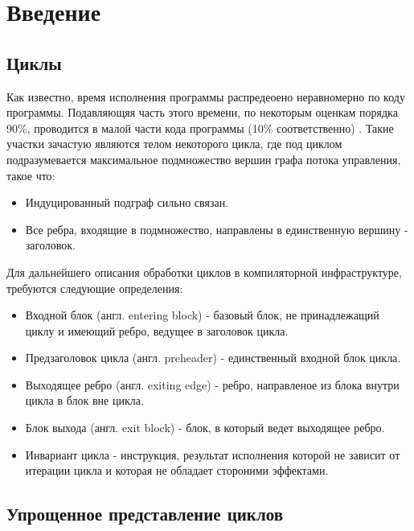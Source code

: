 \chapter{Введение}
\label{sec:Chapter0} 

\section{Циклы}

Как известно, время исполнения программы распредеоено неравномерно по коду программы.
Подавляющяя часть этого времени, по некоторым оценкам порядка 90\%, проводится в малой части кода программы (10\% соответственно) \cite{Aho_Ullman_focs}.
Такие участки зачастую являются телом некоторого цикла, где под циклом подразумевается максимальное подмножество вершин графа потока управления, такое что:
\begin{itemize}
    \item Индуцированный подграф сильно связан.
    \item Все ребра, входящие в подмножество, направлены в единственную вершину - заголовок.
\end{itemize}

Для дальнейшего описания обработки циклов в компиляторной инфраструктуре, требуются следующие определения:
\begin{itemize}
    \item Входной блок (англ. entering block) - базовый блок, не принадлежащий циклу и имеющий ребро, ведущее в заголовок цикла.
    \item Предзаголовок цикла (англ. preheader) - единственный входной блок цикла.
    \item Выходящее ребро (англ. exiting edge) - ребро, направленое из блока внутри цикла в блок вне цикла.
    \item Блок выхода (англ. exit block) - блок, в который ведет выходящее ребро.
    \item Инвариант цикла - инструкция, результат исполнения которой не зависит от итерации цикла и которая не обладает стороними эффектами.
\end{itemize}

\section{Упрощенное представление циклов}

